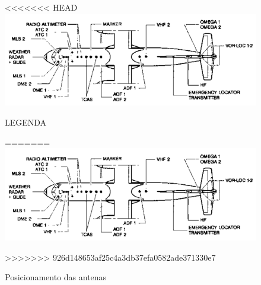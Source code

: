 \begin{figure}
<<<<<<< HEAD
\centering
\includegraphics{images/parte3/sistemas_instrumentacao.png}
\caption{LEGENDA}
=======
\includegraphics[width=\textwidth]{images/parte3/sistemas_instrumentacao.png}
\caption{Posicionamento das antenas}
>>>>>>> 926d148653af25c4a3db37efa0582ade371330e7
\label{fig:sistemas_instrumentacao}
\end{figure}
